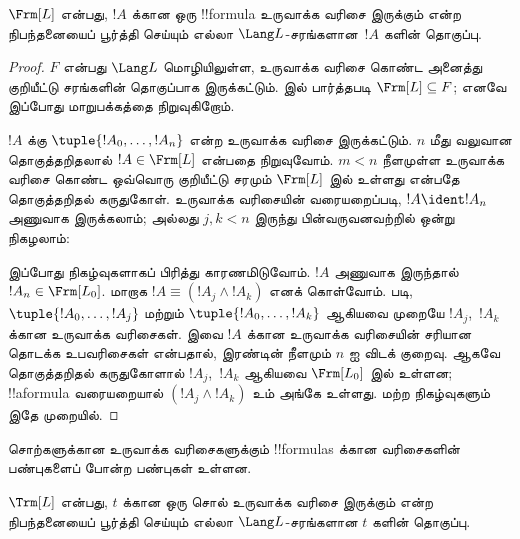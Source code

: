 \documentclass[../../../include/open-logic-section]{subfiles}
\begin{document}
\begin{thm}
$\Frm[L]$ என்பது, $!A$ க்கான ஒரு !!{formula} உருவாக்க வரிசை இருக்கும் என்ற நிபந்தனையைப்
பூர்த்தி செய்யும் எல்லா $\Lang L$-சரங்களான~$!A$ களின் தொகுப்பு.
\end{thm}

\begin{proof}
$F$ என்பது $\Lang L$ மொழியிலுள்ள, உருவாக்க வரிசை கொண்ட அனைத்து குறியீட்டு
சரங்களின் தொகுப்பாக இருக்கட்டும்.  இல்
பார்த்தபடி $\Frm[L] \subseteq F$; எனவே இப்போது மாறுபக்கத்தை நிறுவுகிறோம்.

$!A$ க்கு $\tuple{!A_0,\dotsc,!A_n}$ என்ற உருவாக்க வரிசை இருக்கட்டும்.
$n$ மீது வலுவான தொகுத்தறிதலால் $!A \in \Frm[L]$ என்பதை நிறுவுவோம்.
$m < n$ நீளமுள்ள உருவாக்க வரிசை கொண்ட ஒவ்வொரு குறியீட்டு சரமும்
$\Frm[L]$ இல் உள்ளது என்பதே தொகுத்தறிதல் கருதுகோள்.
உருவாக்க வரிசையின் வரையறைப்படி, $!A \ident !A_n$ அணுவாக இருக்கலாம்;
அல்லது $j,k < n$ இருந்து பின்வருவனவற்றில் ஒன்று நிகழலாம்:
\begin{enumerate}
\end{enumerate}
இப்போது நிகழ்வுகளாகப் பிரித்து காரணமிடுவோம். $!A$ அணுவாக இருந்தால்
$!A_n \in \Frm[L_0]$. மாறாக $!A \equiv (!A_j \land !A_k)$ எனக் கொள்வோம்.
 படி,
$\tuple{!A_0,\dotsc,!A_j}$ மற்றும் $\tuple{!A_0,\dotsc,!A_k}$ ஆகியவை
முறையே $!A_j$,~$!A_k$ க்கான உருவாக்க வரிசைகள். இவை $!A$ க்கான
உருவாக்க வரிசையின் சரியான தொடக்க உபவரிசைகள் என்பதால், இரண்டின் நீளமும்
$n$ ஐ விடக் குறைவு. ஆகவே தொகுத்தறிதல் கருதுகோளால் $!A_j$,~$!A_k$
ஆகியவை $\Frm[L_0]$ இல் உள்ளன; !!a{formula} வரையறையால்
$(!A_j \land !A_k)$ உம் அங்கே உள்ளது. மற்ற நிகழ்வுகளும் இதே முறையில்.
\end{proof}

சொற்களுக்கான உருவாக்க வரிசைகளுக்கும் !!{formula}s க்கான வரிசைகளின் பண்புகளைப்
போன்ற பண்புகள் உள்ளன.

\begin{prop}
$\Trm[L]$ என்பது, $t$ க்கான ஒரு சொல் உருவாக்க வரிசை இருக்கும் என்ற நிபந்தனையைப்
பூர்த்தி செய்யும் எல்லா $\Lang L$-சரங்களான $t$ களின் தொகுப்பு.
\end{prop}
\end{document}
